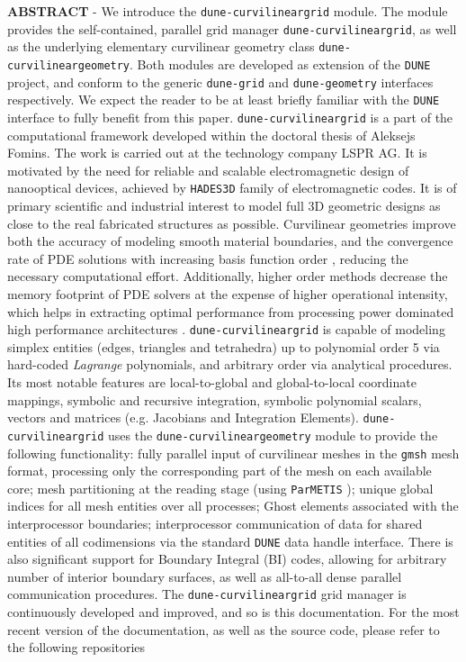 \documentclass[a4paper,11pt]{article}
\newcommand{\citeParMetis}{\cite{schloegel+2002, lasalle+2013}}
\newcommand{\citeGMSH}{\cite{geuzaine+2009}}
\newcommand{\citeDune}{\cite{bastian+2008}}
\newcommand{\dune}{\setlength\emergencystretch{3cm}\texttt{DUNE}}
\newcommand{\gmsh}{\setlength\emergencystretch{3cm}\texttt{gmsh}}
\newcommand{\ParMETIS}{\setlength\emergencystretch{3cm}\texttt{ParMETIS}}
\newcommand{\hades}{\setlength\emergencystretch{3cm}\texttt{HADES3D}}
\newcommand{\dunegeom}{\setlength\emergencystretch{3cm}\texttt{dune-geometry}}
\newcommand{\dunegrid}{\setlength\emergencystretch{3cm}\texttt{dune-grid}}
\newcommand{\curvgeom}{\setlength\emergencystretch{3cm}\texttt{dune-curvilineargeometry}}
\newcommand{\curvgrid}{\setlength\emergencystretch{3cm}\texttt{dune-curvilineargrid}}
\begin{document}
\begin{titlepage}
\noindent \textbf{\textsc{ABSTRACT}} - We introduce the \curvgrid{} module. The module provides the self-contained, parallel grid manager \curvgrid{}, as well as the underlying elementary curvilinear geometry class \curvgeom{}. Both modules are developed as extension of the \dune{} \citeDune{} project, and conform to the generic \dunegrid{} and \dunegeom{} interfaces respectively. We expect the reader to be at least briefly familiar with the \dune{} interface to fully benefit from this paper.
\curvgrid{} is a part of the computational framework developed within the doctoral thesis of Aleksejs Fomins. The work is carried out at the technology company LSPR AG. It is motivated by the need for reliable and scalable electromagnetic design of nanooptical devices, achieved by \hades{} family of electromagnetic codes. It is of primary scientific and industrial interest to model full 3D geometric designs as close to the real fabricated structures as possible. Curvilinear geometries improve both the accuracy of modeling smooth material boundaries, and the convergence rate of PDE solutions with increasing basis function order \cite{fahs2011}, reducing the necessary computational effort. Additionally, higher order methods decrease the memory footprint of PDE solvers at the expense of higher operational intensity, which helps in extracting optimal performance from processing power dominated high performance architectures \cite{williams+2009}.
\curvgrid{} is capable of modeling simplex entities (edges, triangles and tetrahedra) up to polynomial order 5 via hard-coded \textit{Lagrange} polynomials, and arbitrary order via analytical procedures. Its most notable features are local-to-global and global-to-local coordinate mappings, symbolic and recursive integration, symbolic polynomial scalars, vectors and matrices (e.g. Jacobians and Integration Elements).
\curvgrid{} uses the \curvgeom{} module to provide the following functionality: fully parallel input of curvilinear meshes in the \gmsh{} \citeGMSH{} mesh format, processing only the corresponding part of the mesh on each available core; mesh partitioning at the reading stage (using \ParMETIS{} \citeParMetis{}); unique global indices for all mesh entities over all processes; Ghost elements associated with the interprocessor boundaries; interprocessor communication of data for shared entities of all codimensions via the standard \dune{} data handle interface. There is also significant support for Boundary Integral (BI) codes, allowing for arbitrary number of interior boundary surfaces, as well as all-to-all dense parallel communication procedures.
The \curvgrid{} grid manager is continuously developed and improved, and so is this documentation. %
For the most recent version of the documentation, as well as the source code, please refer to the following repositories \\


\end{titlepage}
\end{document}
